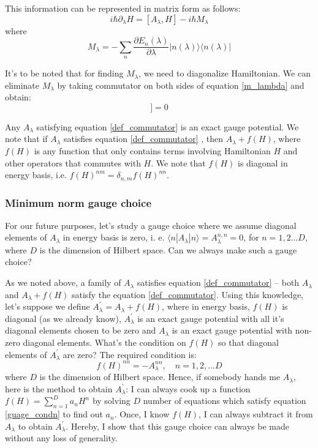 \documentclass[11pt,a4paper]{article}
\begin{document}
This information can be represented in matrix form \cite{jarzynski2013generating} as follows:
\begin{equation}
i \hbar \partial_{\lambda} H= [ A_{\lambda}, H] -i \hbar M_{\lambda} 
\label{m_lambda}
\end{equation}
where 
\begin{equation}
M_{\lambda} = - \sum_n \dfrac{\partial E_n (\lambda)}{\partial \lambda} | n (\lambda) \rangle \langle n (\lambda) |
\end{equation}

It's to be noted that for finding $M_{\lambda}$, we need to diagonalize Hamiltonian. We can eliminate $M_{\lambda}$ by taking commutator on both sides of equation \ref{m_lambda} and obtain:
\begin{equation}
[H, i \hbar \partial_{\lambda}H - [A_{\lambda}, H]]=0
\label{def_commutator}
\end{equation}

Any $A_{\lambda}$ satisfying equation \ref{def_commutator} is an exact gauge potential. We note that  if $A_{\lambda}$ satisfies equation \ref{def_commutator} , then  $A_{\lambda}+ f(H)$, where $f(H)$ is any function that only contains terms involving Hamiltonian $H$ and other operators that commutes with $H$. We note that $f(H)$ is diagonal in energy basis, i.e. $f(H)^{nm}= \delta_{n,m} f(H)^{nn}$.
\subsubsection{Minimum norm gauge choice}
For our future purposes, let's study a gauge choice where we assume diagonal elements of $A_{\lambda}$ in energy basis is zero, i. e.  $ \langle n |A_{\lambda}|n\rangle= A_{\lambda}^{n,n} =0$, for $n=1,2 \ldots D$, where $D$ is the dimension of Hilbert space.  Can we always make such a gauge choice?

As we noted above,  a family of $A_{\lambda}$ satisfies equation \ref{def_commutator} -- both $A_{\lambda}$ and $A_{\lambda} + f(H)$ satisfy the equation \ref{def_commutator}. Using this knowledge, let's suppose we define $A_{\lambda}^{\prime}= A_{\lambda} + f(H)$, where in energy basis, $f(H)$ is diagonal (as we already know), $A_{\lambda}^{\prime}$  is an exact gauge potential with all it's diagonal elements chosen to be zero and $A_{\lambda}$ is an exact gauge potential with non-zero diagonal elements. What's the condition on $f(H)$ so that diagonal elements of $A_{\lambda}^{\prime}$  are zero? The required condition is:
\begin{equation}
 f(H)^{nn}= -A_{\lambda}^{nn}, \quad n=1,2, \ldots D
 \label{guage_condn}
\end{equation}
  where $D$ is the dimension of Hilbert space. Hence, if somebody hands me $A_{\lambda}$, here is the method to obtain $A_{\lambda}^{\prime}$: I can always cook up a function $f(H)= \sum_{n=1}^D a_n H^n$ by solving $D$ number of equations which satisfy equation \ref{guage_condn} to find out $a_n$. Once, I know $f(H)$, I can always subtract it from $A_{\lambda}$ to obtain $A_{\lambda}^{\prime}$. Hereby, I show that this gauge choice can always be made without any loss of generality.
\end{document}
